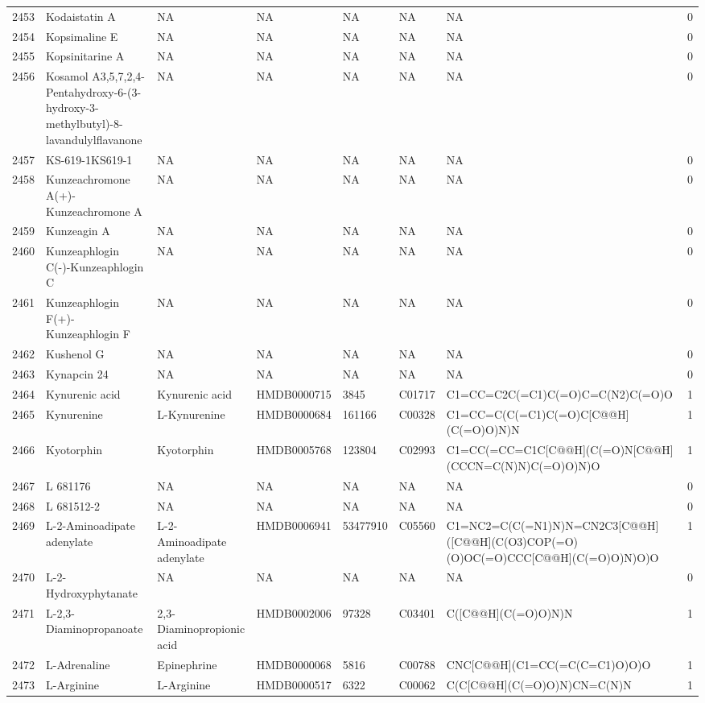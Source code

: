 \documentclass[a4paper]{article}
\begin{document}
\begin{longtable}{rlllllll}
  2453 & Kodaistatin A & NA & NA & NA & NA & NA & 0 \\ 
  2454 & Kopsimaline E & NA & NA & NA & NA & NA & 0 \\ 
  2455 & Kopsinitarine A & NA & NA & NA & NA & NA & 0 \\ 
  2456 & Kosamol A3,5,7,2,4-Pentahydroxy-6-(3-hydroxy-3-methylbutyl)-8-lavandulylflavanone & NA & NA & NA & NA & NA & 0 \\ 
  2457 & KS-619-1KS619-1 & NA & NA & NA & NA & NA & 0 \\ 
  2458 & Kunzeachromone A(+)-Kunzeachromone A & NA & NA & NA & NA & NA & 0 \\ 
  2459 & Kunzeagin A & NA & NA & NA & NA & NA & 0 \\ 
  2460 & Kunzeaphlogin C(-)-Kunzeaphlogin C & NA & NA & NA & NA & NA & 0 \\ 
  2461 & Kunzeaphlogin F(+)-Kunzeaphlogin F & NA & NA & NA & NA & NA & 0 \\ 
  2462 & Kushenol G & NA & NA & NA & NA & NA & 0 \\ 
  2463 & Kynapcin 24 & NA & NA & NA & NA & NA & 0 \\ 
  2464 & Kynurenic acid & Kynurenic acid & HMDB0000715 & 3845 & C01717 & C1=CC=C2C(=C1)C(=O)C=C(N2)C(=O)O & 1 \\ 
  2465 & Kynurenine & L-Kynurenine & HMDB0000684 & 161166 & C00328 & C1=CC=C(C(=C1)C(=O)C[C@@H](C(=O)O)N)N & 1 \\ 
  2466 & Kyotorphin & Kyotorphin & HMDB0005768 & 123804 & C02993 & C1=CC(=CC=C1C[C@@H](C(=O)N[C@@H](CCCN=C(N)N)C(=O)O)N)O & 1 \\ 
  2467 & L 681176 & NA & NA & NA & NA & NA & 0 \\ 
  2468 & L 681512-2 & NA & NA & NA & NA & NA & 0 \\ 
  2469 & L-2-Aminoadipate adenylate & L-2-Aminoadipate adenylate & HMDB0006941 & 53477910 & C05560 & C1=NC2=C(C(=N1)N)N=CN2C3[C@@H]([C@@H](C(O3)COP(=O)(O)OC(=O)CCC[C@@H](C(=O)O)N)O)O & 1 \\ 
  2470 & L-2-Hydroxyphytanate & NA & NA & NA & NA & NA & 0 \\ 
  2471 & L-2,3-Diaminopropanoate & 2,3-Diaminopropionic acid & HMDB0002006 & 97328 & C03401 & C([C@@H](C(=O)O)N)N & 1 \\ 
  2472 & L-Adrenaline & Epinephrine & HMDB0000068 & 5816 & C00788 & CNC[C@@H](C1=CC(=C(C=C1)O)O)O & 1 \\ 
  2473 & L-Arginine & L-Arginine & HMDB0000517 & 6322 & C00062 & C(C[C@@H](C(=O)O)N)CN=C(N)N & 1 \\ 

\end{longtable}
\end{document}
